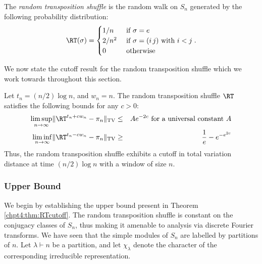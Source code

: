 \documentclass[11pt]{report}
\begin{document}
\begin{defn}
	\label{chpt4:def:RT}
	The \emph{random transposition shuffle} is the  
	random walk on 	$S_n$ generated by the following probability distribution:
	\[\RT(\sigma) = \begin{cases}
	1/n & \text{ if } \sigma = e \\
	2/n^{2} & \text{ if } \sigma = (i \, j) \text{ with } i < j \\ 
	0 & \text{ otherwise }
	\end{cases}.\]
\end{defn}

We now state the cutoff result for the random transposition shuffle which we 
work towards throughout this section.

\begin{thm}
	\label{chpt4:thm:RTcutoff}
	Let $t_{n} = (n/2)\log n$, 	and $w_{n} = n$. The random transposition shuffle $\RT$ satisfies the following bounds for any $c>0$:
	\begin{eqnarray}
	\limsup_{n\to \infty}\lVert \RT^{t_{n} +cw_{n}} -\pi_{n} \rVert_{\tiny 
		\textnormal{TV}} & \leq &A e^{-2c} \textnormal{ for a universal 
		constant } A\\
	\liminf_{n\to\infty}\lVert \RT^{t_{n} -cw_{n}} -\pi_{n} \rVert_{\tiny 
		\textnormal{TV}} & \geq & \frac{1}{e} - e^{-e^{2c}} 
	\end{eqnarray}
	Thus, the random transposition shuffle exhibits a cutoff in total variation distance at time $(n/2)\log n$ with a window of size $n$.
\end{thm}

\subsubsection{Upper Bound}
We begin by establishing the upper bound present in Theorem \ref{chpt4:thm:RTcutoff}.  
The random transposition shuffle is constant on the conjugacy classes of $S_{n}$, thus 
making it amenable to analysis via discrete Fourier transforms. 
We have seen that the simple modules of $S_{n}$ are labelled by partitions of $n$.  Let $\lambda \vdash n$ be a partition, and let $\chi_{\lambda}$ denote the character of the corresponding irreducible representation.
\end{document}
